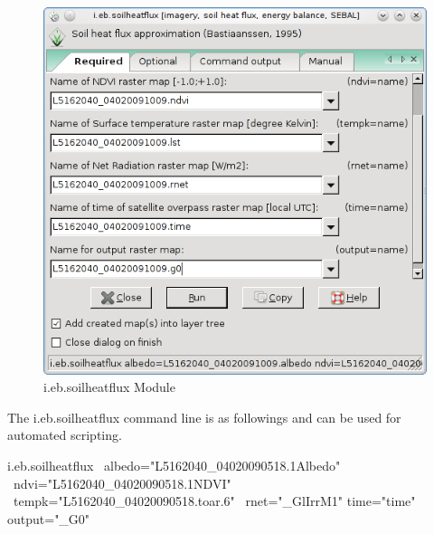 \begin{figure}[htbp]
   \centering
   \includegraphics[scale=0.4]{gipe026.png}
   \caption{i.eb.soilheatflux Module}
   \label{fig:gipe026}
\end{figure}

The i.eb.soilheatflux command line is as followings and can be used for automated scripting.
\begin{smallverbatim}
i.eb.soilheatflux \
    albedo="L5162040_04020090518.1Albedo" \
    ndvi="L5162040_04020090518.1NDVI" \
    tempk="L5162040_04020090518.toar.6" \
    rnet="_GlIrrM1" time="time" output="_G0" 
\end{smallverbatim}


